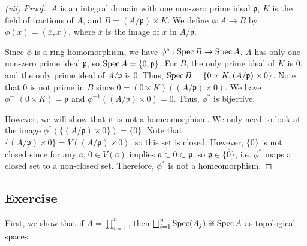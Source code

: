 \begin{proof}[(vii) Proof.]
$A$ is an integral domain with one non-zero prime ideal $\mathfrak{p}$, $K$ is the field of fractions of $A$, and $B = (A/\mathfrak{p}) \times K$. We
define $\phi: A \to B$ by $\phi(x) = (\overline{x}, x)$, where $\overline{x}$ is the image of $x$ in $A/\mathfrak{p}$.

Since $\phi$ is a ring homomorphism, we have $\phi^*: \operatorname{Spec} B \to \operatorname{Spec} A$. $A$ has only one non-zero prime ideal $\mathfrak{p}$, so $\operatorname{Spec} A = \{0,\mathfrak{p}\}$.
For $B$, the only prime ideal of $K$ is $0$, and the only prime ideal of $A / \mathfrak{p}$ is $0$. Thus, $\operatorname{Spec} B = \{0 \times K, (A / \mathfrak{p}) \times 0\}$. Note
that $0$ is not prime in $B$ since $0 = (0 \times K)((A / \mathfrak{p}) \times 0)$. We have $\phi^{-1}(0 \times K) = \mathfrak{p}$ and $\phi^{-1}((A / \mathfrak{p}) \times 0) = 0$.
Thus, $\phi^*$ is bijective.

However, we will show that it is not a homeomorphism. We only need to look at the image $\phi^*(\{(A / \mathfrak{p}) \times 0\}) = \{0\}$. Note that 
$\{(A / \mathfrak{p}) \times 0\} = V((A / \mathfrak{p}) \times 0)$, so this set is closed. However, $\{0\}$ is not closed since for any $\mathfrak{a}$, 
$0 \in V(\mathfrak{a})$ implies $\mathfrak{a} \subset 0 \subset \mathfrak{p}$, so $\mathfrak{p} \in \overline{\{0\}}$, i.e. $\phi^*$ maps a closed set to a non-closed
set. Therefore, $\phi^*$ is not a homeomorphism.
\end{proof}

\subsection{Exercise}\label{1.22}

First, we show that if $A = \prod_{i=1}^n$, then $\bigsqcup_{i=1}^n \operatorname{Spec}(A_j) \cong \operatorname{Spec} A$ as topological spaces.

